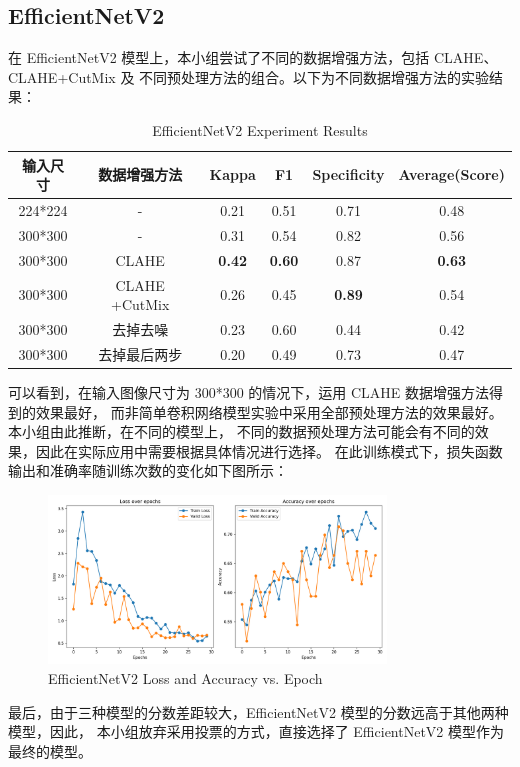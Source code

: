 \documentclass[UTF8,12pt,a4paper]{ctexart}
\begin{document}
\subsection{EfficientNetV2}
在 EfficientNetV2 模型上，本小组尝试了不同的数据增强方法，包括 CLAHE、CLAHE+CutMix 及
不同预处理方法的组合。以下为不同数据增强方法的实验结果：
\begin{table}[H]
    \centering
    \begin{tabular}{|c|c|c|c|c|c|}
    \hline
        输入尺寸 & 数据增强方法 & Kappa & F1 & Specificity & Average(Score)\\
    \hline
		224*224 & - & 0.21 & 0.51 & 0.71 & 0.48 \\
        300*300 & - & 0.31 & 0.54 & 0.82 & 0.56 \\
        300*300 & CLAHE 	& \textbf{0.42} & \textbf{0.60} & 0.87 & \textbf{0.63} \\
        300*300 & CLAHE +CutMix & 0.26 & 0.45 & \textbf{0.89} & 0.54\\
        300*300 & 去掉去噪 & 0.23 & 0.60 & 0.44 & 0.42 \\
        300*300 & 去掉最后两步 & 0.20 & 0.49 & 0.73 & 0.47 \\
    \hline
	\end{tabular}
	\caption{EfficientNetV2 Experiment Results}
\end{table}
可以看到，在输入图像尺寸为 300*300 的情况下，运用 CLAHE 数据增强方法得到的效果最好，
而非简单卷积网络模型实验中采用全部预处理方法的效果最好。本小组由此推断，在不同的模型上，
不同的数据预处理方法可能会有不同的效果，因此在实际应用中需要根据具体情况进行选择。
在此训练模式下，损失函数输出和准确率随训练次数的变化如下图所示：
\begin{figure}[H]
	\centering
	\includegraphics[width=0.8\textwidth]{picture/efficientnet-epoch.png}
	\caption{EfficientNetV2 Loss and Accuracy vs. Epoch}
\end{figure}

最后，由于三种模型的分数差距较大，EfficientNetV2 模型的分数远高于其他两种模型，因此，
本小组放弃采用投票的方式，直接选择了 EfficientNetV2 模型作为最终的模型。
\end{document}

